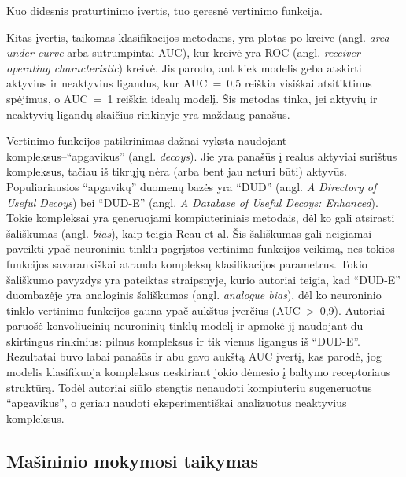 Kuo didesnis praturtinimo įvertis, tuo geresnė vertinimo funkcija. 

Kitas įvertis, taikomas klasifikacijos metodams, yra plotas po kreive (angl. \textit{area under curve} arba sutrumpintai AUC), kur kreivė yra ROC (angl. \textit{receiver operating characteristic}) kreivė. Jis parodo, ant kiek modelis geba atskirti aktyvius ir neaktyvius ligandus, kur AUC~=~0,5 reiškia visiškai atsitiktinus spėjimus, o AUC~=~1 reiškia idealų modelį. Šis metodas tinka, jei aktyvių ir neaktyvių ligandų skaičius rinkinyje yra maždaug panašus.\cite{huang_scoring_2010}

Vertinimo funkcijos patikrinimas dažnai vyksta naudojant kompleksus--\enquote{apgavikus} (angl. \textit{decoys}). Jie yra panašūs į realus aktyviai surištus kompleksus, tačiau iš tikrųjų nėra (arba bent jau neturi būti) aktyvūs. Populiariausios \enquote{apgavikų} duomenų bazės yra \enquote{DUD} (angl. \textit{A Directory of Useful Decoys}) bei \enquote{DUD-E} (angl. \textit{A Database of Useful Decoys: Enhanced}).\cite{berry_practical_2015} Tokie kompleksai yra generuojami kompiuteriniais metodais, dėl ko gali atsirasti šališkumas (angl. \textit{bias}), kaip teigia Reau et al.\cite{reau_decoys_2018} Šis šališkumas gali neigiamai paveikti ypač neuroniniu tinklu pagrįstos vertinimo funkcijos veikimą, nes tokios funkcijos savarankiškai atranda kompleksų klasifikacijos parametrus. Tokio šališkumo pavyzdys yra pateiktas straipsnyje\cite{chen_hidden_2019}, kurio autoriai teigia, kad \enquote{DUD-E} duombazėje yra analoginis šališkumas (angl. \textit{analogue bias}), dėl ko neuroninio tinklo vertinimo funkcijos gauna ypač aukštus įverčius (AUC~>~0,9). Autoriai paruošė konvoliucinių neuroninių tinklų modelį ir apmokė jį naudojant du skirtingus rinkinius: pilnus kompleksus ir tik vienus ligangus iš \enquote{DUD-E}. Rezultatai buvo labai panašūs ir abu gavo aukštą AUC įvertį, kas parodė, jog modelis klasifikuoja kompleksus neskiriant jokio dėmesio į baltymo receptoriaus struktūrą. Todėl autoriai siūlo stengtis nenaudoti kompiuteriu sugeneruotus \enquote{apgavikus}, o geriau naudoti eksperimentiškai analizuotus neaktyvius kompleksus. 


\subsection{Mašininio mokymosi taikymas}

